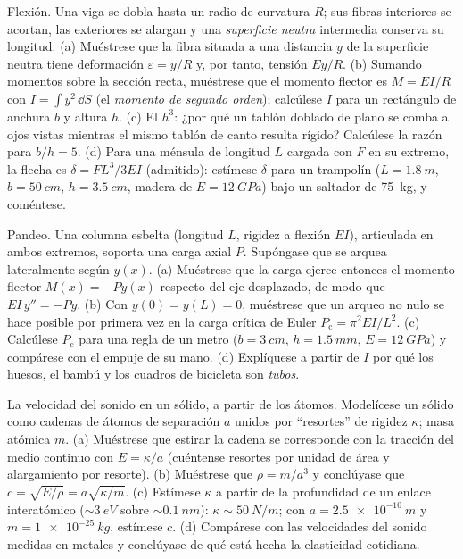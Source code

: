 \begin{exercise}[$\star\star\star$]\label{exo:b3:continuum-elasticity:10}
Flexión. Una viga se dobla hasta un radio de curvatura $R$; sus fibras
interiores se acortan, las exteriores se alargan y una \emph{superficie
neutra} intermedia conserva su longitud. (a) Muéstrese que la fibra situada
a una distancia $y$ de la superficie neutra tiene deformación
$\varepsilon = y/R$ y, por tanto, tensión $Ey/R$.
(b) Sumando momentos sobre la sección recta, muéstrese que el momento
flector es $M = EI/R$ con $I = \int y^2\,\dd S$ (el \emph{momento de segundo
orden}); calcúlese $I$ para un rectángulo de anchura $b$ y altura $h$. (c) El
$h^3$: ¿por qué un tablón doblado de plano se comba a ojos vistas mientras
el mismo tablón de canto resulta rígido? Calcúlese la razón para $b/h = 5$.
(d) Para una ménsula de longitud $L$ cargada con $F$ en su extremo, la
flecha es $\delta = FL^3/3EI$ (admitido): estímese $\delta$ para un trampolín
($L = \qty{1.8}{m}$, $b = \qty{50}{cm}$, $h = \qty{3.5}{cm}$, madera de $E
= \qty{12}{GPa}$) bajo un saltador de \qty{75}{kg}, y coméntese.
\end{exercise}

\begin{exercise}[$\star\star\star$]\label{exo:b3:continuum-elasticity:11}
Pandeo. Una columna esbelta (longitud $L$, rigidez a flexión $EI$),
articulada en ambos extremos, soporta una carga axial $P$. Supóngase que se
arquea lateralmente según $y(x)$. (a) Muéstrese que la carga ejerce entonces
el momento flector $M(x) = -Py(x)$ respecto del eje desplazado, de modo que
$EI\,y'' = -Py$. (b) Con $y(0) = y(L) = 0$, muéstrese que un arqueo no nulo
se hace posible por primera vez en la carga crítica de Euler
$P_{\text{c}} = \pi^2EI/L^2$. (c) Calcúlese $P_{\text{c}}$ para una regla de
un metro ($b = \qty{3}{cm}$, $h = \qty{1.5}{mm}$, $E = \qty{12}{GPa}$) y
compárese con el empuje de su mano. (d) Explíquese a partir de $I$ por qué los
huesos, el bambú y los cuadros de bicicleta son \emph{tubos}.
\end{exercise}

\begin{exercise}[$\star\star\star$]\label{exo:b3:continuum-elasticity:12}
La velocidad del sonido en un sólido, a partir de los átomos. Modelícese un
sólido como cadenas de átomos de separación $a$ unidos por ``resortes'' de
rigidez $\kappa$; masa atómica $m$. (a) Muéstrese que estirar la cadena se
corresponde con la tracción del medio continuo con $E = \kappa/a$ (cuéntense
resortes por unidad de área y alargamiento por resorte). (b) Muéstrese que
$\rho = m/a^3$ y conclúyase que $c =
\sqrt{E/\rho} = a\sqrt{\kappa/m}$. (c) Estímese $\kappa$ a partir de la
profundidad de un enlace interatómico ($\sim\qty{3}{eV}$ sobre $\sim
\qty{0.1}{nm}$): $\kappa \sim \qty{50}{N/m}$; con $a =
\qty{2.5e-10}{m}$ y $m = \qty{1e-25}{kg}$, estímese $c$. (d) Compárese con
las velocidades del sonido medidas en metales y conclúyase de qué está hecha
la elasticidad cotidiana.
\end{exercise}

